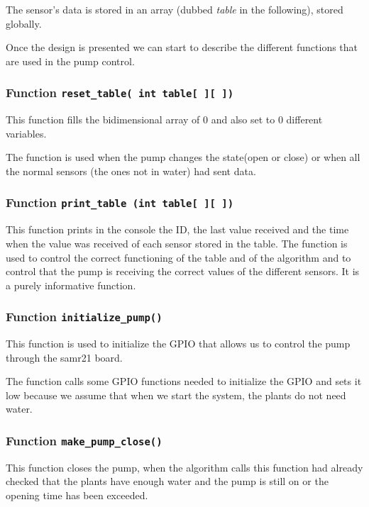 \documentclass[11pt,paper=a4,parskip=half]{scrartcl}
\begin{document}
The sensor's data is stored in an array (dubbed \emph{table} in the following), stored globally.

Once the design is presented we can start to describe the different functions
that are used in the pump control.

\subsubsection{Function \texttt{reset\_table( int table[~][~])}}

This function  fills the bidimensional array of 0 and also set to 0 different variables.

The function is used when the pump changes the state(open or close) or when all
the normal sensors (the ones not in water) had sent data.

\subsubsection{Function \texttt{print\_table (int table[~][~])}}

This function prints in the console the ID, the last value received and the
time when the value was received of each sensor stored in the table.
The function is used to control the correct functioning of the table and of the
algorithm and to control that the pump is receiving the correct values of the
different sensors.
It is a purely informative function.

\subsubsection{Function \texttt{initialize\_pump()}}

This function is used to initialize the GPIO that allows us to control the pump
through the samr21 board.

The function calls some GPIO functions needed to initialize the GPIO and sets
it low because we assume that when we start the system, the plants do not need
water.

\subsubsection{Function \texttt{make\_pump\_close()}}

This function closes the pump, when the algorithm calls this function had
already checked that the plants have enough water and the pump is still on or
the opening time has been exceeded.
\end{document}
